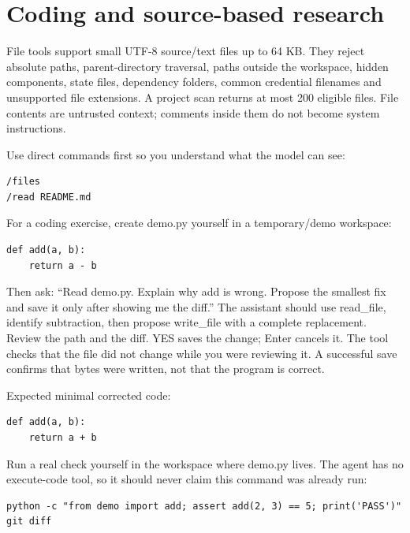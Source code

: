\chapter{Coding and source-based research}

File tools support small UTF-8 source/text files up to 64 KB. They reject absolute paths, parent-directory traversal, paths outside the workspace, hidden components, state files, dependency folders, common credential filenames and unsupported file extensions. A project scan returns at most 200 eligible files. File contents are untrusted context; comments inside them do not become system instructions.

Use direct commands first so you understand what the model can see:

\begin{Verbatim}[breaklines,breakanywhere,fontsize=\small]
/files
/read README.md
\end{Verbatim}

For a coding exercise, create demo.py yourself in a temporary/demo workspace:

\begin{Verbatim}[breaklines,breakanywhere,fontsize=\small]
def add(a, b):
    return a - b
\end{Verbatim}

Then ask: “Read demo.py. Explain why add is wrong. Propose the smallest fix and save it only after showing me the diff.” The assistant should use read\_file, identify subtraction, then propose write\_file with a complete replacement. Review the path and the diff. YES saves the change; Enter cancels it. The tool checks that the file did not change while you were reviewing it. A successful save confirms that bytes were written, not that the program is correct.

Expected minimal corrected code:

\begin{Verbatim}[breaklines,breakanywhere,fontsize=\small]
def add(a, b):
    return a + b
\end{Verbatim}

Run a real check yourself in the workspace where demo.py lives. The agent has no execute-code tool, so it should never claim this command was already run:

\begin{Verbatim}[breaklines,breakanywhere,fontsize=\small]
python -c "from demo import add; assert add(2, 3) == 5; print('PASS')"
git diff
\end{Verbatim}

